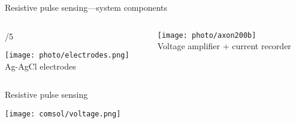\begin{frame}[c]{Resistive pulse sensing---system components}
\begin{columns}[t]
	\end{columns}
	
	\vspace{1cm}
	
	\begin{columns}[t]
		\begin{column}[T]{\paperwidth/5}
			{\centering
				\texttt{[image: photo/electrodes.png]} \\
				{\footnotesize Ag-AgCl electrodes}
				\par
			}
		\end{column}
		
		
		\begin{column}[T]{.6\paperwidth}
			{\centering
				\texttt{[image: photo/axon200b]} \\
				Voltage amplifier + current recorder
				\par
			}
		\end{column}
	

	\end{columns}




% 	
% 
% 

\end{frame}


\begin{frame}[c]{Resistive pulse sensing}
	{\centering
		\texttt{[image: comsol/voltage.png]}
		\par
	}
\end{frame}

